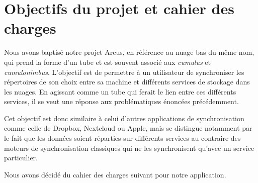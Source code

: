 \section*{Objectifs du projet et cahier des charges}

Nous avons baptisé notre projet Arcus, en référence au nuage bas du même nom, qui prend la forme d'un tube et est souvent associé aux \emph{cumulus} et \emph{cumulonimbus}. L'objectif est de permettre à un utilisateur de synchroniser les répertoires de son choix entre sa machine et différents services de stockage dans les nuages. En agissant comme un tube qui ferait le lien entre ces différents services, il se veut une réponse aux problématiques énoncées précédemment.

Cet objectif est donc similaire à celui d’autres applications de synchronisation comme celle de Dropbox, Nextcloud ou Apple, mais se distingue notamment par le fait que les données soient réparties sur différents services au contraire des moteurs de synchronisation classiques qui ne les synchronisent qu'avec un service particulier.

Nous avons décidé du cahier des charges suivant pour notre application.

